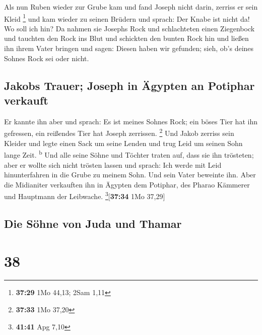  Als nun Ruben wieder zur Grube kam und fand Joseph nicht
darin, zerriss er sein Kleid \footnote{\textbf{37:29} 1Mo 44,13; 2Sam
  1,11}  und kam wieder zu seinen Brüdern und sprach: Der
Knabe ist nicht da! Wo soll ich hin?  Da nahmen sie
Josephs Rock und schlachteten einen Ziegenbock und tauchten den Rock ins
Blut  und schickten den bunten Rock hin und ließen ihn
ihrem Vater bringen und sagen: Diesen haben wir gefunden; sieh, ob's
deines Sohnes Rock sei oder nicht.

\hypertarget{jakobs-trauer-joseph-in-uxe4gypten-an-potiphar-verkauft}{%
\subsection{Jakobs Trauer; Joseph in Ägypten an Potiphar
verkauft}\label{jakobs-trauer-joseph-in-uxe4gypten-an-potiphar-verkauft}}

 Er kannte ihn aber und sprach: Es ist meines Sohnes
Rock; ein böses Tier hat ihn gefressen, ein reißendes Tier hat Joseph
zerrissen. \footnote{\textbf{37:33} 1Mo 37,20}  Und Jakob
zerriss sein Kleider und legte einen Sack um seine Lenden und trug Leid
um seinen Sohn lange Zeit. \textsuperscript{b}  Und alle
seine Söhne und Töchter traten auf, dass sie ihn trösteten; aber er
wollte sich nicht trösten lassen und sprach: Ich werde mit Leid
hinunterfahren in die Grube zu meinem Sohn. Und sein Vater beweinte ihn.
 Aber die Midianiter verkauften ihn in Ägypten dem
Potiphar, des Pharao Kämmerer und Hauptmann der Leibwache.
\footnote{\textbf{41:41} Apg 7,10}{[}\textbf{37:34} 1Mo 37,29{]}

\hypertarget{die-suxf6hne-von-juda-und-thamar}{%
\subsection{Die Söhne von Juda und
Thamar}\label{die-suxf6hne-von-juda-und-thamar}}

\hypertarget{section-37}{%
\section{38}\label{section-37}}

